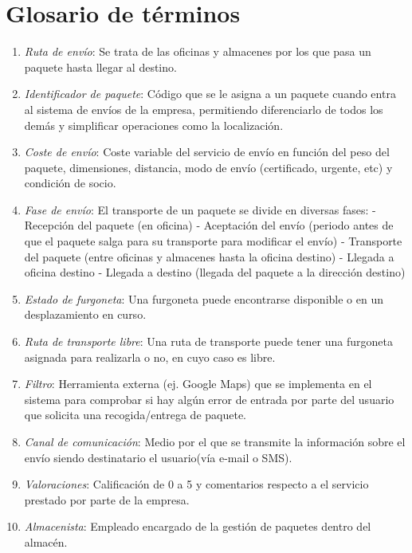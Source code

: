 \section{Glosario de términos}
	\begin{enumerate}
		\item \textit{Ruta de envío}: Se trata de las oficinas y almacenes por los que pasa un paquete hasta llegar al destino.
		\item \textit{Identificador de paquete}: Código que se le asigna a un paquete cuando entra al sistema de envíos de la empresa, permitiendo diferenciarlo de todos los demás y simplificar operaciones como la localización.
		\item \textit{Coste de envío}: Coste variable del servicio de envío en función del peso del paquete, dimensiones, distancia, modo de envío (certificado, urgente, etc) y condición de socio.
		\item \textit{Fase de envío}: El transporte de un paquete se divide en diversas fases: \newline - Recepción del paquete (en oficina)
		\newline - Aceptación del envío (periodo antes de que el paquete salga para su transporte para modificar el envío)
		\newline - Transporte del paquete (entre oficinas y almacenes hasta la oficina destino)		
		\newline - Llegada a oficina destino
		\newline - Llegada a destino (llegada del paquete a la dirección destino)
		\item \textit{Estado de furgoneta}: Una furgoneta puede encontrarse disponible o en un desplazamiento en curso.
		\item \textit{Ruta de transporte libre}: Una ruta de transporte puede tener una furgoneta asignada para realizarla o no, en cuyo caso es libre.
		\item \textit{Filtro}: Herramienta externa (ej. Google Maps) que se implementa  en el sistema para comprobar si hay algún error de entrada por parte del usuario que solicita una recogida/entrega de paquete.
		\item \textit{Canal de comunicación}: Medio por el que se transmite la información sobre el envío siendo destinatario el usuario(vía e-mail o SMS).
		\item \textit{Valoraciones}: Calificación de 0 a 5 y comentarios respecto a el servicio prestado por parte de la empresa.
		\item \textit{Almacenista}: Empleado encargado de la gestión de paquetes dentro del almacén.

\end{enumerate}
